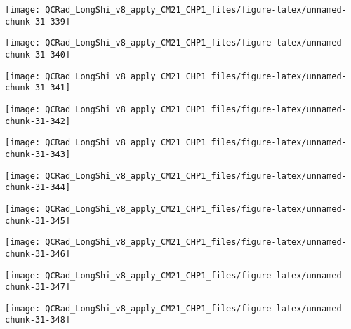 \documentclass[
  10pt,
  a4paper,oneside]{article}
\begin{document}
\begin{center}\texttt{[image: QCRad\_LongShi\_v8\_apply\_CM21\_CHP1\_files/figure-latex/unnamed-chunk-31-339]} \end{center}

\begin{center}\texttt{[image: QCRad\_LongShi\_v8\_apply\_CM21\_CHP1\_files/figure-latex/unnamed-chunk-31-340]} \end{center}

\begin{center}\texttt{[image: QCRad\_LongShi\_v8\_apply\_CM21\_CHP1\_files/figure-latex/unnamed-chunk-31-341]} \end{center}

\begin{center}\texttt{[image: QCRad\_LongShi\_v8\_apply\_CM21\_CHP1\_files/figure-latex/unnamed-chunk-31-342]} \end{center}

\begin{center}\texttt{[image: QCRad\_LongShi\_v8\_apply\_CM21\_CHP1\_files/figure-latex/unnamed-chunk-31-343]} \end{center}

\begin{center}\texttt{[image: QCRad\_LongShi\_v8\_apply\_CM21\_CHP1\_files/figure-latex/unnamed-chunk-31-344]} \end{center}

\begin{center}\texttt{[image: QCRad\_LongShi\_v8\_apply\_CM21\_CHP1\_files/figure-latex/unnamed-chunk-31-345]} \end{center}

\begin{center}\texttt{[image: QCRad\_LongShi\_v8\_apply\_CM21\_CHP1\_files/figure-latex/unnamed-chunk-31-346]} \end{center}

\begin{center}\texttt{[image: QCRad\_LongShi\_v8\_apply\_CM21\_CHP1\_files/figure-latex/unnamed-chunk-31-347]} \end{center}

\begin{center}\texttt{[image: QCRad\_LongShi\_v8\_apply\_CM21\_CHP1\_files/figure-latex/unnamed-chunk-31-348]} \end{center}
\end{document}
